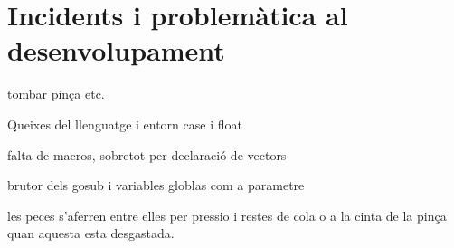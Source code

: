 \section{Incidents i problemàtica al desenvolupament}

tombar pinça etc.

Queixes del llenguatge i entorn
case i float

falta de macros, sobretot per declaració de vectors

brutor dels gosub i variables globlas com a parametre

les peces s'aferren entre elles per pressio i restes de cola o a la cinta de la pinça quan aquesta esta desgastada.